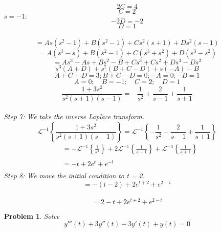 \documentclass{article}
\newtheorem{problem}{Problem}
\begin{document}
    $$2C = 4$$
    $$C = 2$$
    $s = -1:$
    $$-2D = -2$$
    $$D = 1$$
     \\
    $$= As(s^{2} - 1) + B(s^{2} - 1) + Cs^{2}(s + 1) + Ds^{2}(s - 1)$$
    $$= A(s^{3} - s) + B(s^{2} - 1) + C(s^{3} + s^{2}) + D(s^{3} - s^{2})$$ $$= As^{3} - As + Bs^{2} - B + Cs^{3} + Cs^{2} + Ds^{3} - Ds^{2}$$ $$s^{3}(A + D) + s^{2}(B + C - D) + s(-A) - B$$ $$A + C + D = 3; B + C - D = 0; -A = 0; -B = 1$$ $$A = 0;\quad B = -1;\quad C = 2;\quad D = 1$$  $$\frac{1 + 3s^{2}}{s^{2}(s + 1)(s - 1)} = -\frac{1}{s^{2}} + \frac{2}{s - 1} + \frac{1}{s + 1}$$ \\
    \textit{Step 7: We take the inverse Laplace transform.} \\
    $$\mathcal{L}^{-1} \left\{\frac{1 + 3s^{2}}{s^{2}(s + 1)(s - 1)}\right\} = \mathcal{L}^{-1} \left\{-\frac{1}{s^{2}} + \frac{2}{s - 1} + \frac{1}{s + 1}\right\}$$
    \begin{align*}
        &= -\mathcal{L}^{-1} \left\{\frac{1}{s^{2}}\right\} + 2\mathcal{L}^{-1} \left\{\frac{1}{s - 1}\right\} + \mathcal{L}^{-1} \left\{\frac{1}{s + 1}\right\} \\ \\
        &= -t + 2e^{t} + e^{-t}\\
    \end{align*}
    \textit{Step 8: We move the initial condition to t = 2.} \\
    $$=-(t - 2) + 2e^{t + 2} + e^{2 - t}$$ \\
    $$= 2 -t + 2e^{t + 2} + e^{2 - t}$$
    \newpage


    \begin{problem}
        Solve
        \[y'''(t) + 3y''(t) + 3y'(t) + y(t) = 0\] \\
    \end{problem}
\end{document}

